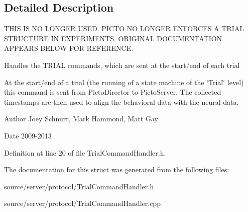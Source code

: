 \subsection{Detailed Description}
T\-H\-I\-S I\-S N\-O L\-O\-N\-G\-E\-R U\-S\-E\-D. P\-I\-C\-T\-O N\-O L\-O\-N\-G\-E\-R E\-N\-F\-O\-R\-C\-E\-S A T\-R\-I\-A\-L S\-T\-R\-U\-C\-T\-U\-R\-E I\-N E\-X\-P\-E\-R\-I\-M\-E\-N\-T\-S. O\-R\-I\-G\-I\-N\-A\-L D\-O\-C\-U\-M\-E\-N\-T\-A\-T\-I\-O\-N A\-P\-P\-E\-A\-R\-S B\-E\-L\-O\-W F\-O\-R R\-E\-F\-E\-R\-E\-N\-C\-E. 

Handles the T\-R\-I\-A\-L commands, which are sent at the start/end of each trial

At the start/end of a trial (the running of a state machine of the \char`\"{}\-Trial\char`\"{} level) this command is sent from Picto\-Director to Picto\-Server. The collected timestamps are then used to align the behavioral data with the neural data. \begin{DoxyAuthor}{Author}
Joey Schnurr, Mark Hammond, Matt Gay 
\end{DoxyAuthor}
\begin{DoxyDate}{Date}
2009-\/2013 
\end{DoxyDate}


Definition at line 20 of file Trial\-Command\-Handler.\-h.



The documentation for this struct was generated from the following files\-:\begin{DoxyCompactItemize}
\item 
source/server/protocol/Trial\-Command\-Handler.\-h\item 
source/server/protocol/Trial\-Command\-Handler.\-cpp\end{DoxyCompactItemize}
